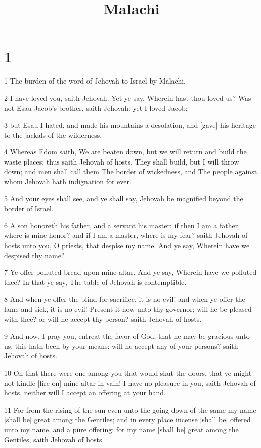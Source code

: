 

\title{Malachi}

\chapter{1}

\par 1 The burden of the word of Jehovah to Israel by Malachi.
\par 2 I have loved you, saith Jehovah. Yet ye say, Wherein hast thou loved us? Was not Esau Jacob's brother, saith Jehovah: yet I loved Jacob;
\par 3 but Esau I hated, and made his mountains a desolation, and [gave] his heritage to the jackals of the wilderness.
\par 4 Whereas Edom saith, We are beaten down, but we will return and build the waste places; thus saith Jehovah of hosts, They shall build, but I will throw down; and men shall call them The border of wickedness, and The people against whom Jehovah hath indignation for ever.
\par 5 And your eyes shall see, and ye shall say, Jehovah be magnified beyond the border of Israel.
\par 6 A son honoreth his father, and a servant his master: if then I am a father, where is mine honor? and if I am a master, where is my fear? saith Jehovah of hosts unto you, O priests, that despise my name. And ye say, Wherein have we despised thy name?
\par 7 Ye offer polluted bread upon mine altar. And ye say, Wherein have we polluted thee? In that ye say, The table of Jehovah is contemptible.
\par 8 And when ye offer the blind for sacrifice, it is no evil! and when ye offer the lame and sick, it is no evil! Present it now unto thy governor; will he be pleased with thee? or will he accept thy person? saith Jehovah of hosts.
\par 9 And now, I pray you, entreat the favor of God, that he may be gracious unto us: this hath been by your means: will he accept any of your persons? saith Jehovah of hosts.
\par 10 Oh that there were one among you that would shut the doors, that ye might not kindle [fire on] mine altar in vain! I have no pleasure in you, saith Jehovah of hosts, neither will I accept an offering at your hand.
\par 11 For from the rising of the sun even unto the going down of the same my name [shall be] great among the Gentiles; and in every place incense [shall be] offered unto my name, and a pure offering: for my name [shall be] great among the Gentiles, saith Jehovah of hosts.
